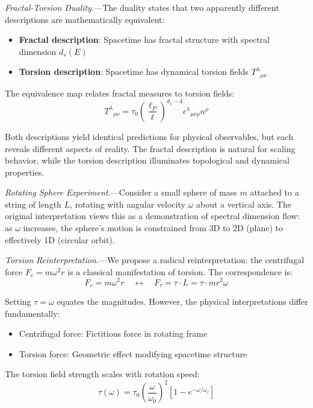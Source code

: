 \documentclass[aps,prl,twocolumn,superscriptaddress,floatfix]{revtex4-2}
\begin{document}
\textit{Fractal-Torsion Duality.}---The duality states that two apparently different descriptions are mathematically equivalent\cite{wang2026}:
\begin{itemize}
    \item \textbf{Fractal description}: Spacetime has fractal structure with spectral dimension $d_s(E)$
    \item \textbf{Torsion description}: Spacetime has dynamical torsion fields $T^\lambda{}_{\mu\nu}$
\end{itemize}

The equivalence map relates fractal measures to torsion fields:
\begin{equation}
    T^\lambda{}_{\mu\nu} = \tau_0 \left(\frac{\ell_P}{\ell}\right)^{d_s-4} \epsilon^\lambda{}_{\mu\nu\rho} n^\rho
\end{equation}

Both descriptions yield identical predictions for physical observables, but each reveals different aspects of reality. The fractal description is natural for scaling behavior, while the torsion description illuminates topological and dynamical properties.

\textit{Rotating Sphere Experiment.}---Consider a small sphere of mass $m$ attached to a string of length $L$, rotating with angular velocity $\omega$ about a vertical axis. The original interpretation\cite{wang2026e6} views this as a demonstration of spectral dimension flow: as $\omega$ increases, the sphere's motion is constrained from 3D to 2D (plane) to effectively 1D (circular orbit).

\textit{Torsion Reinterpretation.}---We propose a radical reinterpretation: the centrifugal force $F_c = m\omega^2 r$ is a classical manifestation of torsion. The correspondence is:
\begin{equation}
    F_c = m\omega^2 r \quad \leftrightarrow \quad F_\tau = \tau \cdot L = \tau \cdot mr^2\omega
\end{equation}

Setting $\tau = \omega$ equates the magnitudes. However, the physical interpretations differ fundamentally:
\begin{itemize}
    \item Centrifugal force: Fictitious force in rotating frame
    \item Torsion force: Geometric effect modifying spacetime structure
\end{itemize}

The torsion field strength scales with rotation speed:
\begin{equation}
    \tau(\omega) = \tau_0 \left(\frac{\omega}{\omega_0}\right)^2 \left[1 - e^{-\omega/\omega_c}\right]
\end{equation}
\end{document}
